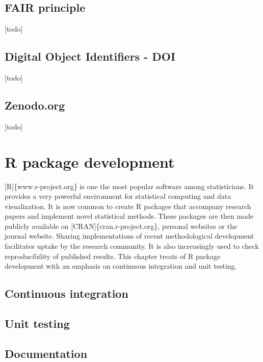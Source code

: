 \documentclass[]{book}
\begin{document}
\section{FAIR principle}\label{sct-fair}

{[}todo{]}

\section{Digital Object Identifiers - DOI}\label{sct-doi}

{[}todo{]}

\section{Zenodo.org}\label{sct-zenodo}

{[}todo{]}

\chapter{R package development}\label{r-package-development}

{[}R{]}\{www.r-project.org\} is one the most popular software among
statisticians. It provides a very powerful environment for statistical
computing and data visualization. It is now common to create R packages
that accompany research papers and implement novel statistical methods.
These packages are then made publicly available on
{[}CRAN{]}\{cran.r-project.org\}, personal websites or the journal
website. Sharing implementations of recent methodological development
facilitates uptake by the research community. It is also increasingly
used to check reproducibility of published results. This chapter treats
of R package development with an emphasis on continuous integration and
unit testing.

\section{Continuous integration}\label{continuous-integration}

\section{Unit testing}\label{unit-testing}

\section{Documentation}\label{documentation}
\end{document}
